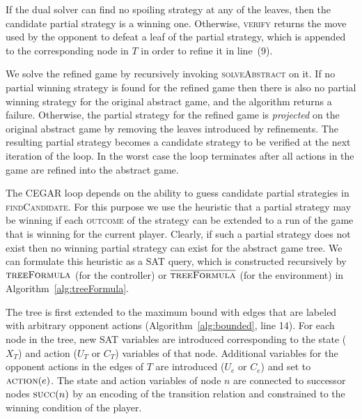 If the dual solver can find no spoiling strategy at any of the leaves, then the
candidate partial strategy is a winning one. Otherwise, \textsc{verify} returns
the move used by the opponent to defeat a leaf of the partial strategy, which
is appended to the corresponding node in $T$ in order to refine it in line~(9).

We solve the refined game by recursively invoking \textsc{solveAbstract} on it.
If no partial winning strategy is found for the refined game then there is also
no partial winning strategy for the original abstract game, and the algorithm
returns a failure.  Otherwise, the partial strategy for the refined game is
\emph{projected} on the original abstract game by removing the leaves
introduced by refinements. The resulting partial strategy becomes a candidate
strategy to be verified at the next iteration of the loop. In the worst case
the loop terminates after all actions in the game are refined into the abstract
game.

The CEGAR loop depends on the ability to guess candidate partial strategies in
\textsc{findCandidate}. For this purpose we use the heuristic that a partial
strategy may be winning if each \textsc{outcome} of the strategy can be
extended to a run of the game that is winning for the current player.  Clearly,
if such a partial strategy does not exist then no winning partial strategy can
exist for the abstract game tree. We can formulate this heuristic as a SAT
query, which is constructed recursively by $\textsc{treeFormula}$ (for the
controller) or $\textsc{$\overline{\mbox{treeFormula}}$}$ (for the environment) in
Algorithm~\ref{alg:treeFormula}.

The tree is first extended to the maximum bound with edges that are labeled
with arbitrary opponent actions (Algorithm~\ref{alg:bounded}, line 14).  For
each node in the tree, new SAT variables are introduced corresponding to the
state ($X_T$) and action ($U_T$ or $C_T$) variables of that node. Additional
variables for the opponent actions in the edges of $T$ are introduced ($U_e$ or
$C_e$) and set to $\textsc{action}(e)$.  The state and action variables of node
$n$ are connected to successor nodes $\textsc{succ}(n)$ by an encoding of the
transition relation and constrained to the winning condition of the player.



